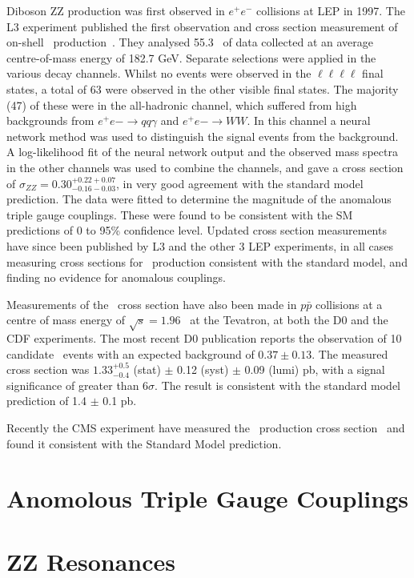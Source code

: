 Diboson ZZ production was first observed in $e^+e^-$ collisions at LEP in 1997.
The L3 experiment published the first observation and cross section measurement
of on-shell \ZZ\ production~\cite{Acciarri1999281}. They analysed 55.3 \ivpb\
of data collected at an average centre-of-mass energy of 182.7 GeV. Separate
selections were applied in the various decay channels. Whilst no events were
observed in the $\ell\ell\ell\ell$ final states, a total of 63 were observed in
the other visible final states. The majority (47) of these were in the
all-hadronic channel, which suffered from high backgrounds from $e^+e-
\rightarrow qq \gamma$ and $e^+e- \rightarrow WW$. In this channel a neural
network method was used to distinguish the signal events from the background. A
log-likelihood fit of the neural network output and the observed mass spectra in
the other channels was used to combine the channels, and gave a cross section of
$\sigma_{ZZ} = 0.30^{+0.22 +0.07}_{-0.16 -0.03}$, in very good agreement with
the standard model prediction. The data were fitted to determine the magnitude
of the anomalous triple gauge couplings. These were found to be consistent with
the SM predictions of 0 to 95\% confidence level. Updated cross section
measurements have since been published by L3 and the other 3 LEP experiments, in
all cases measuring cross sections for \ZZ\ production consistent with the
standard model, and finding no evidence for anomalous couplings.

Measurements of the \ZZ\ cross section have also been made in $p \bar{p}$
collisions at a centre of mass energy of $\sqrt{s} = 1.96$ \tev\ at the Tevatron, at
both the D0 and the CDF experiments. The most recent D0 publication reports the
observation of 10 candidate \ZZ\ events with an expected background of $0.37
\pm 0.13$. The measured cross section was $1.33^{+0.5}_{-0.4}$ (stat) $\pm$ 0.12
(syst) $\pm$ 0.09 (lumi) pb, with a signal significance of greater than
$6\sigma$. The result is consistent with the standard model prediction of 1.4
$\pm$ 0.1 pb. 

Recently the CMS experiment have measured the \ZZ\ production cross
section~\cite{CMS-PAS-EWK-11-010} and found it consistent with the Standard Model prediction.


\section{Anomolous Triple Gauge Couplings}

\section{ZZ Resonances}
